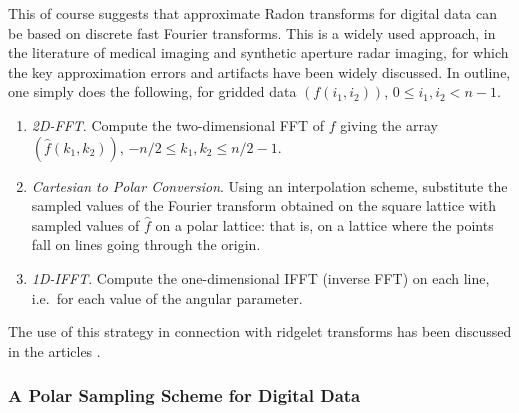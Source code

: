 This of course suggests that approximate Radon transforms
for digital data can be based on discrete fast Fourier
transforms. This is a widely used approach,
in the literature of medical imaging and
synthetic aperture radar imaging, for which the
key approximation errors and artifacts have been widely discussed.
In outline, one
simply does the following, for
gridded data $(f(i_1,i_2))$, $0 \le i_1, i_2 < n-1$.
\begin{enumerate}
\item {\em 2D-FFT}. Compute the two-dimensional FFT of $f$ giving the
      array $(\hat{f}(k_1,k_2))$, $ -n/2 \le k_1, k_2 \le n/2 - 1$.
\item {\em Cartesian to Polar Conversion}. Using an interpolation
      scheme, substitute the sampled values of the Fourier transform
      obtained on the square lattice with sampled values of $\hat{f}$ on a
polar
      lattice: that is, on a lattice where the points fall on lines going
      through the origin.
\item {\em 1D-IFFT}. Compute the one-dimensional IFFT (inverse FFT)
     on each line,
      i.e.\ for each value of the angular parameter.
\end{enumerate}

The use of this strategy in connection with ridgelet transforms has
been discussed in the articles \cite{DRT,FRT,starck:sta01_3}.

\subsubsection{A Polar Sampling Scheme for Digital Data}


